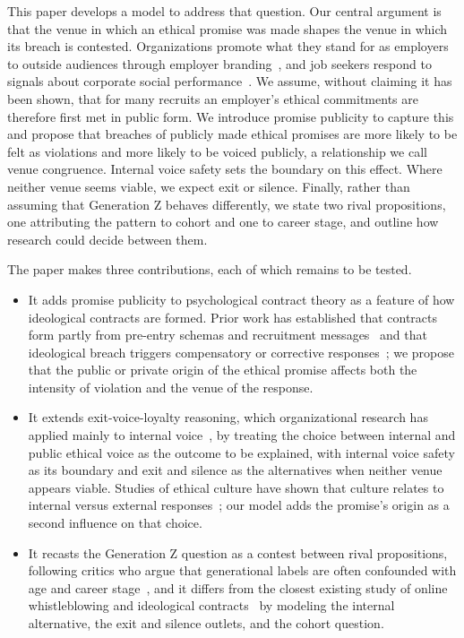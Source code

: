 This paper develops a model to address that question. Our central argument is that the venue in which an ethical promise was made shapes the venue in which its breach is contested. Organizations promote what they stand for as employers to outside audiences through employer branding~\citep{backhaus2004conceptualizing}, and job seekers respond to signals about corporate social performance~\citep{jones2014why}. We assume, without claiming it has been shown, that for many recruits an employer's ethical commitments are therefore first met in public form. We introduce promise publicity to capture this and propose that breaches of publicly made ethical promises are more likely to be felt as violations and more likely to be voiced publicly, a relationship we call venue congruence. Internal voice safety sets the boundary on this effect. Where neither venue seems viable, we expect exit or silence. Finally, rather than assuming that Generation Z behaves differently, we state two rival propositions, one attributing the pattern to cohort and one to career stage, and outline how research could decide between them.

The paper makes three contributions, each of which remains to be tested.

\begin{itemize}
\item It adds promise publicity to psychological contract theory as a feature of how ideological contracts are formed. Prior work has established that contracts form partly from pre-entry schemas and recruitment messages~\citep{rousseau2001schema} and that ideological breach triggers compensatory or corrective responses~\citep{yang2022going,deng2023serving}; we propose that the public or private origin of the ethical promise affects both the intensity of violation and the venue of the response.

\item It extends exit-voice-loyalty reasoning, which organizational research has applied mainly to internal voice~\citep{morrison2014employee}, by treating the choice between internal and public ethical voice as the outcome to be explained, with internal voice safety as its boundary and exit and silence as the alternatives when neither venue appears viable. Studies of ethical culture have shown that culture relates to internal versus external responses~\citep{kaptein2011inaction}; our model adds the promise's origin as a second influence on that choice.

\item It recasts the Generation Z question as a contest between rival propositions, following critics who argue that generational labels are often confounded with age and career stage~\citep{rudolph2017considering,parry2011generational}, and it differs from the closest existing study of online whistleblowing and ideological contracts~\citep{yang2026managing} by modeling the internal alternative, the exit and silence outlets, and the cohort question.
\end{itemize}
